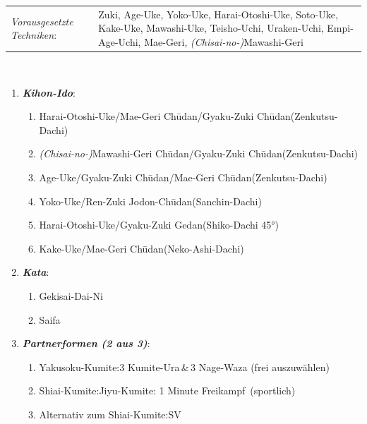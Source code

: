 \documentclass[a5paper,landscape,DIV=calc,11pt,notitlepage]{scrartcl}
\begin{document}
\pagebreak
\begin{tcolorbox}[colback=white,colframe=BLBELT,coltitle=white,title=5. Kyu: Blau]
	\renewcommand{\labelenumi}{\alph{enumi}.)}
	\renewcommand{\labelenumii}{\arabic*.}
	{\scriptsize
		\begin{tabularx}{\textwidth}{lX}
			\textit{Vorausgesetzte Techniken}:& Zuki, Age-Uke, Yoko-Uke, Harai-Otoshi-Uke, Soto-Uke, Kake-Uke, Mawashi-Uke, Teisho-Uchi, Uraken-Uchi, \mbox{Empi-Age-Uchi}, Mae-Geri, \textit{(Chisai-no-)}Mawashi-Geri
		\end{tabularx}\\}
	\begin{enumerate}[nosep]
		\item \textit{\textbf{Kihon-Ido}}:
		\begin{enumerate}[nosep]
			\item Harai-Otoshi-Uke/Mae-Geri Ch\={u}dan/Gyaku-Zuki Ch\={u}dan\tabto{280pt}(Zenkutsu-Dachi)
			\item \textit{(Chisai-no-)}Mawashi-Geri Ch\={u}dan/Gyaku-Zuki Ch\={u}dan\tabto{280pt}(Zenkutsu-Dachi)
			\item Age-Uke/Gyaku-Zuki Ch\={u}dan/Mae-Geri Ch\={u}dan\tabto{280pt}(Zenkutsu-Dachi)
			\item Yoko-Uke/Ren-Zuki Jodon-Ch\={u}dan\tabto{280pt}(Sanchin-Dachi)
			\item Harai-Otoshi-Uke/Gyaku-Zuki Gedan\tabto{280pt}(Shiko-Dachi 45°)
			\item Kake-Uke/Mae-Geri Ch\={u}dan\tabto{280pt}(Neko-Ashi-Dachi)
		\end{enumerate}
		\item \textit{\textbf{Kata}}:
		\begin{enumerate}[nosep]
			\item Gekisai-Dai-Ni
			\item Saifa
		\end{enumerate}
		\item \textit{\textbf{Partnerformen (2 aus 3)}}:
		\begin{enumerate}[nosep]
			\item Yakusoku-Kumite:\tabto{200pt}3 Kumite-Ura\,\&\,3 Nage-Waza (frei auszuwählen)
			\item Shiai-Kumite:\tabto{200pt}Jiyu-Kumite: 1 Minute \frqq Freikampf\flqq~(sportlich)
			\item Alternativ zum Shiai-Kumite:\tabto{200pt}SV
		\end{enumerate}
	\end{enumerate}
\end{tcolorbox}
\end{document}
